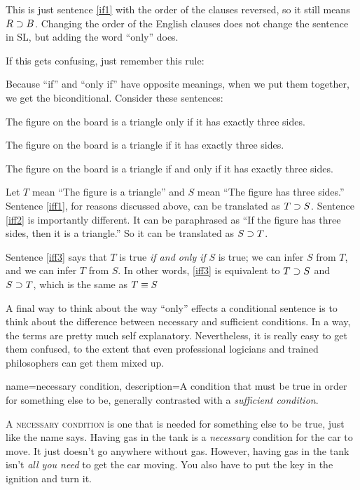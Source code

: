 This is just sentence \ref{if1} with the order of the clauses reversed, so it still means $R \supset B$. Changing the order of the English clauses does not change the sentence in SL, but adding the word ``only'' does.

If this gets confusing, just remember this rule: 


Because ``if'' and ``only if'' have opposite meanings, when we put them together, we get the biconditional. Consider these sentences:
\begin{earg}
\item[\ex{iff1}] The figure on the board is a triangle only if it has exactly three sides.
\item[\ex{iff2}] The figure on the board is a triangle if it has exactly three sides.
\item[\ex{iff3}] The figure on the board is a triangle if and only if it has exactly three sides.
\end{earg}

Let $T$ mean ``The figure is a triangle'' and $S$ mean ``The figure has three sides.'' Sentence \ref{iff1}, for reasons discussed above, can be translated as $T\supset S$. Sentence \ref{iff2} is importantly different. It can be paraphrased as ``If the figure has three sides, then it is a triangle.'' So it can be translated as $S\supset T$.

Sentence \ref{iff3} says that $T$ is true \emph{if and only if} $S$ is true; we can infer $S$ from $T$, and we can infer $T$ from $S$.  In other words, \ref{iff3} is equivalent to $T\supset S$ and $S\supset T$, which is the same as $T \equiv S$

A final way to think about the way ``only'' effects a conditional sentence is to think about the  difference between necessary and sufficient conditions. In a way, the terms are pretty much self explanatory. Nevertheless, it is really easy to get them confused, to the extent that even professional logicians and trained philosophers can get them mixed up. 


{
name=necessary condition,
description={A condition that must be true in order for something else to be, generally contrasted with a \textit{sufficient condition}.}
}

A \textsc{\gls{necessary condition}}\label{def:necessary_condition} is one that is needed for something else to be true, just like the name says. Having gas in the tank is a \textit{necessary} condition for the car to move. It just doesn't go anywhere without gas. However, having gas in the tank isn't \textit{all you need} to get the car moving. You also have to put the key in the  ignition and turn it. 

